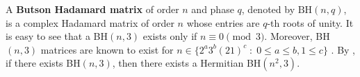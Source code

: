 \documentclass[11pt]{article}
\newtheorem{example}[theorem]{Example}
\begin{document}

A \textbf{Butson Hadamard matrix} of order $n$ and phase $q$, denoted by $\text{BH}(n,q)$, is a complex Hadamard matrix of order $n$ whose entries are $q$-th roots of unity. 
It is easy to see that a BH$(n,3)$ exists only if $n\equiv0\pmod{3}$. 
Moreover, BH$(n,3)$ matrices are known to exist for $n\in \{2^a3^b(21)^c \; :\; 0\leqslant a\leqslant b,1\leqslant c\}$ \cite{AOS,butson}. 
By \cite[Theorem~14]{KS90}, if there exists BH$(n,3)$, then there exists a Hermitian BH$(n^2,3)$. 
\end{document}
